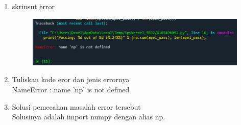 \begin{enumerate}
	\item
skrinsut error
\begin{figure}[!htbp]
	\centering
	\includegraphics[scale=0.8]{figures/np_not_defined_error.PNG}
\end{figure}
	\item
Tuliskan kode eror dan jenis errornya\\
NameError : name 'np' is not defined
	\item
Solusi pemecahan masalah error tersebut\\
Solusinya adalah import numpy dengan alias np.

\end{enumerate}

